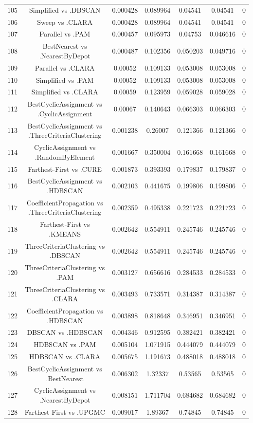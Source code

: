 \documentclass[a4paper,10pt]{article}
\begin{document}
\begin{landscape}
\begin{table}[!htp]
\begin{tabular}{ccccccc}
105&Simplified vs .DBSCAN&0.000428&0.089964&0.04541&0.04541&0\\
106&Sweep vs .CLARA&0.000428&0.089964&0.04541&0.04541&0\\
107&Parallel vs .PAM&0.000457&0.095973&0.04753&0.046616&0\\
108&BestNearest vs .NearestByDepot&0.000487&0.102356&0.050203&0.049716&0\\
109&Parallel vs .CLARA&0.00052&0.109133&0.053008&0.053008&0\\
110&Simplified vs .PAM&0.00052&0.109133&0.053008&0.053008&0\\
111&Simplified vs .CLARA&0.00059&0.123959&0.059028&0.059028&0\\
112&BestCyclicAssignment vs .CyclicAssignment&0.00067&0.140643&0.066303&0.066303&0\\
113&BestCyclicAssignment vs .ThreeCriteriaClustering&0.001238&0.26007&0.121366&0.121366&0\\
114&CyclicAssignment vs .RandomByElement&0.001667&0.350004&0.161668&0.161668&0\\
115&Farthest-First vs .CURE&0.001873&0.393393&0.179837&0.179837&0\\
116&BestCyclicAssignment vs .HDBSCAN&0.002103&0.441675&0.199806&0.199806&0\\
117&CoefficientPropagation vs .ThreeCriteriaClustering&0.002359&0.495338&0.221723&0.221723&0\\
118&Farthest-First vs .KMEANS&0.002642&0.554911&0.245746&0.245746&0\\
119&ThreeCriteriaClustering vs .DBSCAN&0.002642&0.554911&0.245746&0.245746&0\\
120&ThreeCriteriaClustering vs .PAM&0.003127&0.656616&0.284533&0.284533&0\\
121&ThreeCriteriaClustering vs .CLARA&0.003493&0.733571&0.314387&0.314387&0\\
122&CoefficientPropagation vs .HDBSCAN&0.003898&0.818648&0.346951&0.346951&0\\
123&DBSCAN vs .HDBSCAN&0.004346&0.912595&0.382421&0.382421&0\\
124&HDBSCAN vs .PAM&0.005104&1.071915&0.444079&0.444079&0\\
125&HDBSCAN vs .CLARA&0.005675&1.191673&0.488018&0.488018&0\\
126&BestCyclicAssignment vs .BestNearest&0.006302&1.32337&0.53565&0.53565&0\\
127&CyclicAssignment vs .NearestByDepot&0.008151&1.711704&0.684682&0.684682&0\\
128&Farthest-First vs .UPGMC&0.009017&1.89367&0.74845&0.74845&0\\

\end{tabular}
\end{table}
\end{landscape}
\end{document}

